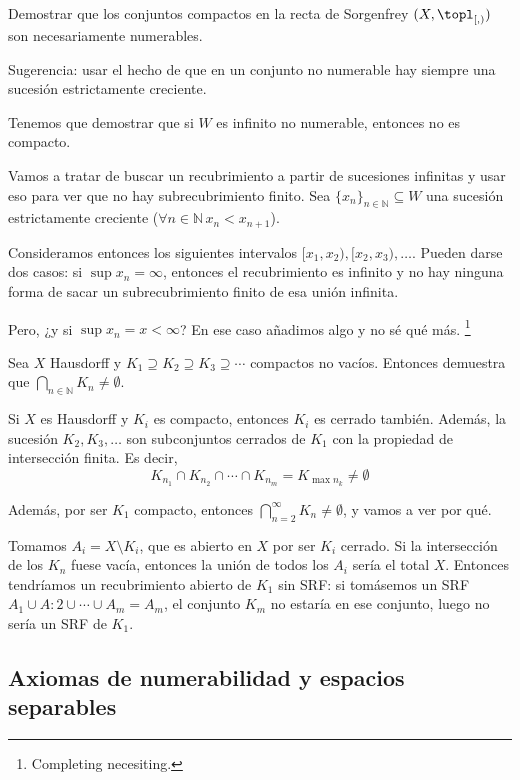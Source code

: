 \begin{problem}[16] Demostrar que los conjuntos compactos en la recta de Sorgenfrey $(X, \topl_{[,)})$ son necesariamente numerables.

Sugerencia: usar el hecho de que en un conjunto no numerable hay siempre una sucesión estrictamente creciente.
\solution

Tenemos que demostrar que si $W$ es infinito no numerable, entonces no es compacto.

Vamos a tratar de buscar un recubrimiento a partir de sucesiones infinitas y usar eso para ver que no hay subrecubrimiento finito. Sea $\{ x_n\}_{n∈ℕ} ⊆ W$ una sucesión estrictamente creciente ($∀n ∈ ℕ\, x_n < x_{n+1}$).

Consideramos entonces los siguientes intervalos $[x_1, x_2), [x_2, x_3), \dotsc$. Pueden darse dos casos: si $\sup x_n = ∞$, entonces el recubrimiento es infinito y no hay ninguna forma de sacar un subrecubrimiento finito de esa unión infinita.

Pero, ¿y si $\sup x_n = x < ∞$? En ese caso añadimos algo y no sé qué más. \footnote{Completing necesiting.}

\end{problem}

\begin{problem}[17] Sea $X$ Hausdorff y $K_1 ⊇K_2 ⊇ K_3 ⊇ \dotsb $ compactos no vacíos. Entonces demuestra que $\bigcap_{n∈ℕ} K_n ≠ ∅$.
\solution

Si $X$ es Hausdorff y $K_i$ es compacto, entonces $K_i$ es cerrado también. Además, la sucesión $K_2, K_3, \dotsc$ son subconjuntos cerrados de $K_1$ con la propiedad de intersección finita.  Es decir, \[ K_{n_1} ∩ K_{n_2} ∩ \dotsb ∩ K_{n_m}  = K_{\max n_k} ≠ ∅\]

Además, por ser $K_1$ compacto, entonces $\bigcap_{n=2}^∞ K_n ≠ ∅$, y vamos a ver por qué.

Tomamos $A_i = X \setminus K_i$, que es abierto en $X$ por ser $K_i$ cerrado. Si la intersección de los $K_n$ fuese vacía, entonces la unión de todos los $A_i$ sería el total $X$. Entonces tendríamos un recubrimiento abierto de $K_1$ sin SRF: si tomásemos un SRF $A_1 ∪ A:2 ∪ \dotsb ∪ A_m = A_m$, el conjunto $K_m$ no estaría en ese conjunto, luego no sería un SRF de $K_1$.
\end{problem}

\subsection{Axiomas de numerabilidad y espacios separables}

